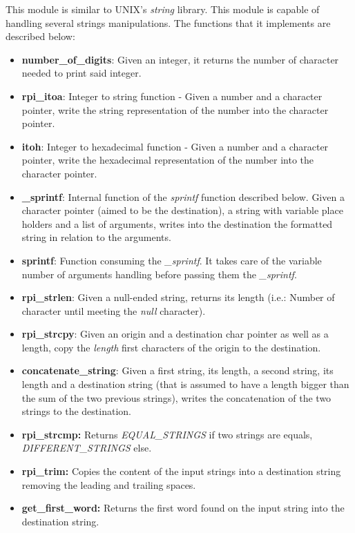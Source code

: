 This module is similar to UNIX's \textit{string} library. This module is capable of handling several strings manipulations. The functions that it implements are described below:
\begin{itemize}
	\item \textbf{number\_of\_digits}: Given an integer, it returns the number of character needed to print said integer.
	\item \textbf{rpi\_itoa}: Integer to string function - Given a number and a character pointer, write the string representation of the number into the character pointer.
	\item \textbf{itoh}: Integer to hexadecimal function - Given a number and a character pointer, write the hexadecimal representation of the number into the character pointer.
	\item \textbf{\_sprintf}: Internal function of the \textit{sprintf} function described below. Given a character pointer (aimed to be the destination), a string with variable place holders and a list of arguments, writes into the destination the formatted string in relation to the arguments.
	\item \textbf{sprintf}: Function consuming the \textit{\_sprintf}. It takes care of the variable number of arguments handling before passing them the \textit{\_sprintf}.
	\item \textbf{rpi\_strlen}: Given a null-ended string, returns its length (i.e.: Number of character until meeting the \textit{null} character).
	\item \textbf{rpi\_strcpy}: Given an origin and a destination char pointer as well as a length, copy the \textit{length} first characters of the origin to the destination.
	\item \textbf{concatenate\_string}: Given a first string, its length, a second string, its length and a destination string (that is assumed to have a length bigger than the sum of the two previous strings), writes the concatenation of the two strings to the destination.
    \item\textbf{rpi\_strcmp:} Returns \textit{EQUAL\_STRINGS} if two strings are equals, \textit{DIFFERENT\_STRINGS} else.
    \item\textbf{rpi\_trim:} Copies the content of the input strings into a destination string removing the leading and trailing spaces.
    \item\textbf{get\_first\_word:} Returns the first word found on the input string into the destination string.
\end{itemize}





